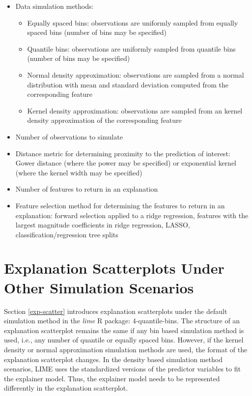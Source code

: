 \documentclass[AMS,STIX2COL]{WileyNJD-v2}\usepackage[]{graphicx}\usepackage[]{color}
\begin{document}
\begin{itemize}

\item Data simulation methods:

\begin{itemize}
\item Equally spaced bins: observations are uniformly sampled from equally spaced bins (number of bins may be specified)
\item Quantile bins: observations are uniformly sampled from quantile bins (number of bins may be specified)
\item Normal density approximation: observations are sampled from a normal distribution with mean and standard deviation computed from the corresponding feature
\item Kernel density approximation: observations are sampled from an kernel density approximation of the corresponding feature
\end{itemize}

\item Number of observations to simulate

\item Distance metric for determining proximity to the prediction of interest: Gower distance (where the power may be specified) or exponential kernel (where the kernel width may be specified)

\item Number of features to return in an explanation

\item Feature selection method for determining the features to return in an explanation: forward selection applied to a ridge regression, features with the largest magnitude coefficients in ridge regression, LASSO, classification/regression tree splits

\end{itemize}

\section{Explanation Scatterplots Under Other Simulation Scenarios} \label{exp-scatter_plus}

Section \ref{exp-scatter} introduces explanation scatterplots under the default simulation method in the \emph{lime} R package: 4-quantile-bins. The structure of an explanation scatterplot remains the same if any bin based simulation method is used, i.e., any number of quantile or equally spaced bins. However, if the kernel density or normal approximation simulation methods are used, the format of the explanation scatterplot changes. In the density based simulation method scenarios, LIME uses the standardized versions of the predictor variables to fit the explainer model. Thus, the explainer model needs to be represented differently in the explanation scatterplot.
\end{document}
